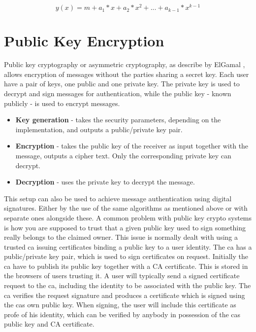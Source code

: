 \begin{equation}
 y(x) = m + a_1*x + a_2*x^2 + ... + a_{k-1} * x^{k-1} 
\end{equation}\label{eq:polynom}


\section{Public Key Encryption}\label{sec:pke}
Public key cryptography or asymmetric cryptography, as describe by ElGamal \cite{elgamal},  allows encryption of messages without the parties sharing a secret key. Each user have a pair of keys, one public and one private key. The private key is used to decrypt and sign messages for authentication, while the public key - known publicly - is used to encrypt messages. 
\begin{itemize}
\item \textbf{Key generation} - takes the security parameters, depending on the implementation, and outputs a public/private key pair.
\item \textbf{ Encryption } - takes the public key of the receiver as input together with the message, outputs a cipher text. Only the corresponding private key can decrypt.
\item \textbf{ Decryption } - uses the private key to decrypt the message.
\end{itemize}

This setup can also be used to achieve message authentication using digital signatures. Either by the use of the same algorithms as mentioned above or with separate ones alongside these. A common problem with public key crypto systems is how you are supposed to trust that a given public key used to sign something really belongs to the claimed owner. This issue is normally dealt with using a trusted \gls{ca} issuing certificates binding a public key to a user identity. The \gls{ca} has a public/private key pair, which is used to sign certificates on request. Initially the \gls{ca} have to publish its public key together with a CA certificate. This is stored in the browsers of users trusting it. A user will typically send a signed certificate request to the \gls{ca}, including the identity to be associated with the public key. The \gls{ca} verifies the request signature and produces a certificate which is signed using the \glspl{ca} own public key. When signing, the user will include this certificate as profe of his identity, which can be verified by anybody in possession of the \glspl{ca} public key and CA certificate. 




